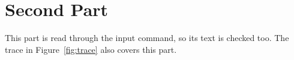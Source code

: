 \section{Second Part}
\label{sec:part}
This part is read through the input command, so its text is checked too.
The trace in Figure~\ref{fig:trace} also covers this part.
